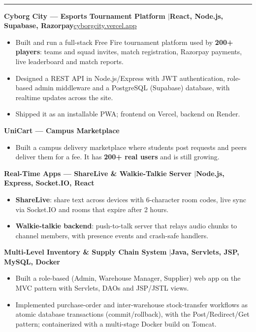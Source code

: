\documentclass[10pt,a4paper]{article}
\renewcommand{\section}[1]{\vspace{6pt}{\large\bfseries\MakeUppercase{#1}}\\[-7pt]\rule{\textwidth}{0.6pt}\vspace{2pt}}
\newcommand{\entry}[2]{\par\textbf{#1}\hfill #2\par}
\newenvironment{points}{\vspace{-4pt}\begin{itemize}\setlength{\itemsep}{0pt}\setlength{\parskip}{0pt}\setlength{\topsep}{0pt}\setlength{\partopsep}{0pt}\setlength{\leftmargin}{12pt}}{\end{itemize}\vspace{-2pt}}
\newcommand{\sep}{\enspace$|$\enspace}
\begin{document}
\section{Projects}
\entry{Cyborg City --- Esports Tournament Platform \textnormal{\sep React, Node.js, Supabase, Razorpay}}{\href{https://cyborgcity.vercel.app}{cyborgcity.vercel.app}}
\begin{points}
  \item Built and run a full-stack Free Fire tournament platform used by \textbf{200+ players}: teams and squad invites, match registration, Razorpay payments, live leaderboard and match reports.
  \item Designed a REST API in Node.js/Express with JWT authentication, role-based admin middleware and a PostgreSQL (Supabase) database, with realtime updates across the site.
  \item Shipped it as an installable PWA; frontend on Vercel, backend on Render.
\end{points}
\entry{UniCart --- Campus Marketplace}{}
\begin{points}
  \item Built a campus delivery marketplace where students post requests and peers deliver them for a fee. It has \textbf{200+ real users} and is still growing.
\end{points}
\entry{Real-Time Apps --- ShareLive \& Walkie-Talkie Server \textnormal{\sep Node.js, Express, Socket.IO, React}}{}
\begin{points}
  \item \textbf{ShareLive}: share text across devices with 6-character room codes, live sync via Socket.IO and rooms that expire after 2 hours.
  \item \textbf{Walkie-talkie backend}: push-to-talk server that relays audio chunks to channel members, with presence events and crash-safe handlers.
\end{points}
\entry{Multi-Level Inventory \& Supply Chain System \textnormal{\sep Java, Servlets, JSP, MySQL, Docker}}{}
\begin{points}
  \item Built a role-based (Admin, Warehouse Manager, Supplier) web app on the MVC pattern with Servlets, DAOs and JSP/JSTL views.
  \item Implemented purchase-order and inter-warehouse stock-transfer workflows as atomic database transactions (commit/rollback), with the Post/Redirect/Get pattern; containerized with a multi-stage Docker build on Tomcat.
\end{points}
\end{document}
